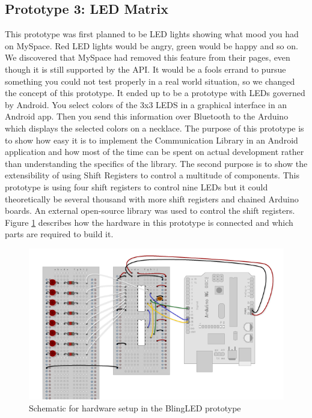 \subsection{Prototype 3: LED Matrix} \label{section:prototype-led}
This prototype was first planned to be LED lights showing what mood you had on MySpace.
Red LED lights would be angry, green would be happy and so on. We discovered that MySpace had removed this feature from their pages, even though it is still supported by the API. It would be a fools errand to pursue something you could not test properly
in a real world situation, so we changed the concept of this prototype. It ended up to be a prototype with LEDs governed by Android.
You select colors of the 3x3 LEDS in a graphical interface in an Android app. Then you send this information over Bluetooth
to the Arduino which displays the selected colors on a necklace.
The purpose of this prototype is to show how easy it is to implement the Communication Library in an Android application and how most of the time can be spent on actual development rather than understanding the specifics of the library. The second purpose is to show the extensibility of using Shift Registers to control a multitude of components. This prototype is using four shift registers to control nine LEDs but it could theoretically be several thousand with more shift registers and chained Arduino boards. An external open-source library was used to control the shift registers\cite{link:shiftpwm}.  Figure \ref{fig:design-blingled-schematic} describes how the hardware in this prototype is connected and which parts are required to build it.

\begin{figure}[h!]
	\centering
	\includegraphics[scale=1.0]{img/blingled-schematic}
	\caption{Schematic for hardware setup in the BlingLED prototype}
	\label{fig:design-blingled-schematic}
\end{figure}


